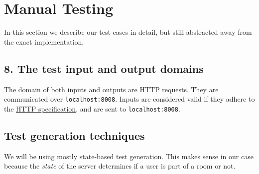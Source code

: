 \documentclass{article}
\begin{document}
\section*{Manual Testing}
In this section we describe our test cases in detail, but still abstracted away from the exact implementation.

\subsection*{8. The test input and output domains}
The domain of both inputs and outputs are HTTP requests. They are communicated over \texttt{localhost:8008}. Inputs are considered valid if they adhere to the \href{https://www.w3.org/Protocols/}{HTTP specification}, and are sent to \texttt{localhost:8008}.
\subsection*{Test generation techniques}
We will be using mostly state-based test generation. This makes sense in our case because the \textit{state} of the server determines if a user is part of a room or not.
\end{document}
